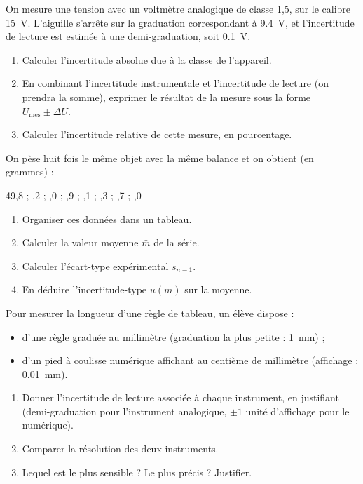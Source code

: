 \documentclass[11pt]{article}
\begin{document}
\begin{exercice}
On mesure une tension avec un voltmètre analogique de classe 1,5, sur le calibre \SI{15}{V}. L'aiguille s'arrête sur la graduation correspondant à \SI{9,4}{V}, et l'incertitude de lecture est estimée à une demi-graduation, soit \SI{0,1}{V}.
\begin{enumerate}
\item Calculer l'incertitude absolue due à la classe de l'appareil.
\item En combinant l'incertitude instrumentale et l'incertitude de lecture (on prendra la somme), exprimer le résultat de la mesure sous la forme $U_{\text{mes}} \pm \Delta U$.
\item Calculer l'incertitude relative de cette mesure, en pourcentage.
\end{enumerate}
\end{exercice}

\begin{exercice}
On pèse huit fois le même objet avec la même balance et on obtient (en grammes) :
\begin{center}
49,8 \quad ; ,2 \quad ; ,0 \quad ; ,9 \quad ; ,1 \quad ; ,3 \quad ; ,7 \quad ; ,0
\end{center}
\begin{enumerate}
\item Organiser ces données dans un tableau.
\item Calculer la valeur moyenne $\bar{m}$ de la série.
\item Calculer l'écart-type expérimental $s_{n-1}$.
\item En déduire l'incertitude-type $u(\bar{m})$ sur la moyenne.
\end{enumerate}
\end{exercice}

\begin{exercice}
Pour mesurer la longueur d'une règle de tableau, un élève dispose :
\begin{itemize}
\item d'une règle graduée au millimètre (graduation la plus petite : \SI{1}{mm}) ;
\item d'un pied à coulisse numérique affichant au centième de millimètre (affichage : \SI{0,01}{mm}).
\end{itemize}
\begin{enumerate}
\item Donner l'incertitude de lecture associée à chaque instrument, en justifiant (demi-graduation pour l'instrument analogique, $\pm 1$ unité d'affichage pour le numérique).
\item Comparer la résolution des deux instruments.
\item Lequel est le plus sensible ? Le plus précis ? Justifier.
\end{enumerate}
\end{exercice}
\end{document}
